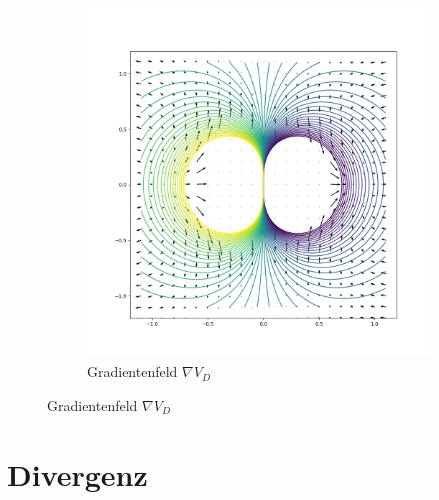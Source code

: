 \documentclass[11pt]{article}
\theoremstyle{plain}
\theoremstyle{definition}
\theoremstyle{remark}
\begin{document}
\begin{itemize}
\begin{figure}[h]
\begin{subfigure}{0.5\textwidth}
		\includegraphics[width=\textwidth]{VD.png} 
		\caption{Gradientenfeld $\nabla V_D$}
	\end{subfigure}
\end{figure}

\end{itemize}


\section{Divergenz}
\end{document}
